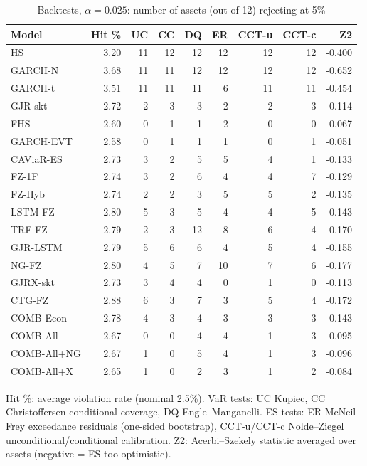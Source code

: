 \begin{table}[htbp]
\centering
\footnotesize
\caption{Backtests, $\alpha=0.025$: number of assets (out of 12) rejecting at 5\%}
\label{tab:bt_a025}
\begin{tabular}{lrrrrrrrr}
\toprule
Model & Hit \% & UC & CC & DQ & ER & CCT-u & CCT-c & Z2 \\
\midrule
HS & 3.20 & 11 & 12 & 12 & 12 & 12 & 12 & -0.400 \\
GARCH-N & 3.68 & 11 & 11 & 12 & 12 & 12 & 12 & -0.652 \\
GARCH-t & 3.51 & 11 & 11 & 11 & 6 & 11 & 11 & -0.454 \\
GJR-skt & 2.72 & 2 & 3 & 3 & 2 & 2 & 3 & -0.114 \\
FHS & 2.60 & 0 & 1 & 1 & 2 & 0 & 0 & -0.067 \\
GARCH-EVT & 2.58 & 0 & 1 & 1 & 1 & 0 & 1 & -0.051 \\
CAViaR-ES & 2.73 & 3 & 2 & 5 & 5 & 4 & 1 & -0.133 \\
FZ-1F & 2.74 & 3 & 2 & 6 & 4 & 4 & 7 & -0.129 \\
FZ-Hyb & 2.74 & 2 & 2 & 3 & 5 & 5 & 2 & -0.135 \\
LSTM-FZ & 2.80 & 5 & 3 & 5 & 4 & 4 & 5 & -0.143 \\
TRF-FZ & 2.79 & 2 & 3 & 12 & 8 & 6 & 4 & -0.170 \\
GJR-LSTM & 2.79 & 5 & 6 & 6 & 4 & 5 & 4 & -0.155 \\
NG-FZ & 2.80 & 4 & 5 & 7 & 10 & 7 & 6 & -0.177 \\
GJRX-skt & 2.73 & 3 & 4 & 4 & 0 & 1 & 0 & -0.113 \\
CTG-FZ & 2.88 & 6 & 3 & 7 & 3 & 5 & 4 & -0.172 \\
COMB-Econ & 2.78 & 4 & 3 & 4 & 3 & 3 & 3 & -0.143 \\
COMB-All & 2.67 & 0 & 0 & 4 & 4 & 1 & 3 & -0.095 \\
COMB-All+NG & 2.67 & 1 & 0 & 5 & 4 & 1 & 3 & -0.096 \\
COMB-All+X & 2.65 & 1 & 0 & 2 & 3 & 1 & 2 & -0.084 \\
\bottomrule
\end{tabular}
\par\smallskip\parbox{\linewidth}{\scriptsize Hit \%: average violation rate (nominal 2.5\%). VaR tests: UC Kupiec, CC Christoffersen conditional coverage, DQ Engle--Manganelli. ES tests: ER McNeil--Frey exceedance residuals (one-sided bootstrap), CCT-u/CCT-c Nolde--Ziegel unconditional/conditional calibration. Z2: Acerbi--Szekely statistic averaged over assets (negative = ES too optimistic).}
\end{table}